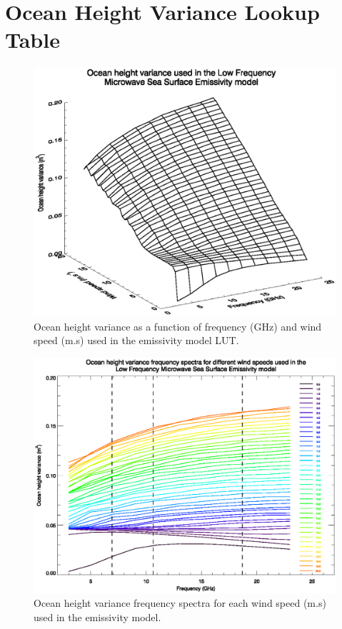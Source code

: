 \section{Ocean Height Variance Lookup Table}

\begin{figure}[htp]
  \centering
  \includegraphics[scale=0.8]{graphics/LUT/sdd_sfc.eps}
  \caption{Ocean height variance as a function of frequency (GHz) and wind speed (m.s) used in the emissivity model LUT.}
  \label{fig:sdd_sfc}
\end{figure}

\begin{figure}[htp]
  \centering
  \includegraphics[scale=0.8]{graphics/LUT/sdd_frequency_spectra.eps}
  \caption{Ocean height variance frequency spectra for each wind speed (m.s) used in the emissivity model.}
  \label{fig:sdd_frequency_spectra}
\end{figure}

